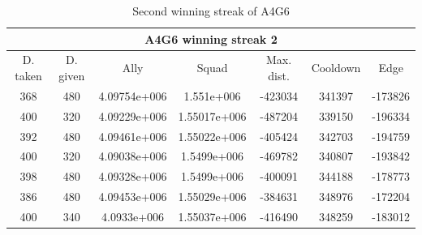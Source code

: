 \begin{centering}
\begin{table}
 \begin{tabular}{|c||c|c|c|c|c|c|}
	\multicolumn{7}{c}{A4G6 winning streak 2} \\
	\hline
	D. taken & 				D. given & 			Ally & 			Squad & 			Max. dist. & 			Cooldown & 				Edge \\
	\hline
	368& 								480& 					4.09754e+006&	1.551e+006&		-423034&							341397&				-173826\\
	400& 								320& 					4.09229e+006&	1.55017e+006&	-487204&							339150&				-196334\\
	392& 								480& 					4.09461e+006&	1.55022e+006&	-405424&							342703&				-194759\\
	400& 								320& 					4.09038e+006&	1.5499e+006&		-469782&							340807&				-193842\\
	398& 								480& 					4.09328e+006&	1.5499e+006&		-400091&							344188&				-178773\\
	386& 								480& 					4.09453e+006&	1.55029e+006&	-384631&							348976&				-172204\\
	400&		 							340&						4.0933e+006&		1.55037e+006&	-416490&							348259&				-183012\\

	\hline

\end{tabular}
	\caption{Second winning streak of A4G6}
	\label{winning_streak_A4G6_1.2}
\end{table}
\end{centering}



